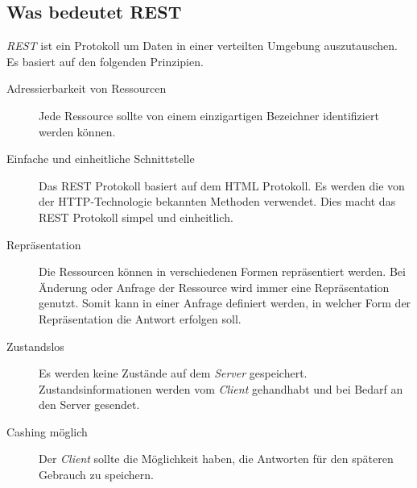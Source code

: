 \documentclass[12pt, paper=a4, bibtotoc, toc=listof, headsepline=true, numbers=endperiod]{scrreprt}
\begin{document}
\subsection{Was bedeutet REST}
\emph{\ac{REST}} ist ein Protokoll um Daten in einer verteilten Umgebung auszutauschen. Es basiert auf den folgenden Prinzipien\cite[S.77]{chauhan2014asp}.
\begin{description}  
	\item  [Adressierbarkeit von Ressourcen]
	Jede Ressource sollte von einem einzigartigen Bezeichner identifiziert werden können.
	
	\item [Einfache und einheitliche Schnittstelle]
	Das \ac{REST} Protokoll basiert auf dem \ac{HTML} Protokoll. Es werden die von der \ac{HTTP}-Technologie bekannten Methoden verwendet. Dies macht das \ac{REST} Protokoll 
	simpel und einheitlich.
	
	\item  [Repräsentation] 
	Die Ressourcen können in verschiedenen Formen repräsentiert werden. Bei Änderung oder Anfrage der Ressource wird immer eine Repräsentation genutzt. Somit kann in einer Anfrage definiert werden, in welcher Form der Repräsentation die Antwort erfolgen soll.
	
	\item [Zustandslos]
	Es werden keine Zustände auf dem \emph{Server} gespeichert. Zustandsinformationen werden vom \emph{Client} gehandhabt und bei Bedarf an den Server gesendet.
	
	\item [Cashing möglich]
	Der \emph{Client} sollte die Möglichkeit haben,  die Antworten für den späteren Gebrauch zu speichern.	
\end{description}
\end{document}

